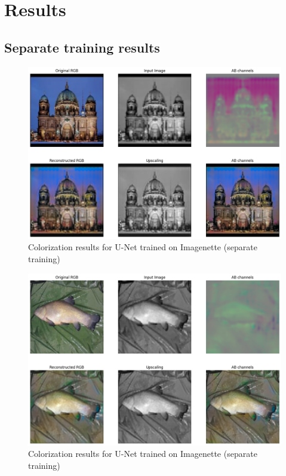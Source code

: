 \documentclass[aspectratio=169]{beamer}
\theoremstyle{definition}
\begin{document}
\section{Results}
\subsection{Separate training results}
\begin{frame}
    \tableofcontents[currentsubsection]
\end{frame}

\begin{frame}
    \begin{figure}
        \centering
        \includegraphics[width=.75\textwidth]{demo-pipeline/building.png}
        \caption{Colorization results for U-Net trained on Imagenette (separate training)}
    \end{figure}
\end{frame}

\begin{frame}
    \begin{figure}
        \centering
        \includegraphics[width=.75\textwidth]{demo-pipeline/fish.png}
        \caption{Colorization results for U-Net trained on Imagenette (separate training)}
    \end{figure}
\end{frame}
\end{document}
